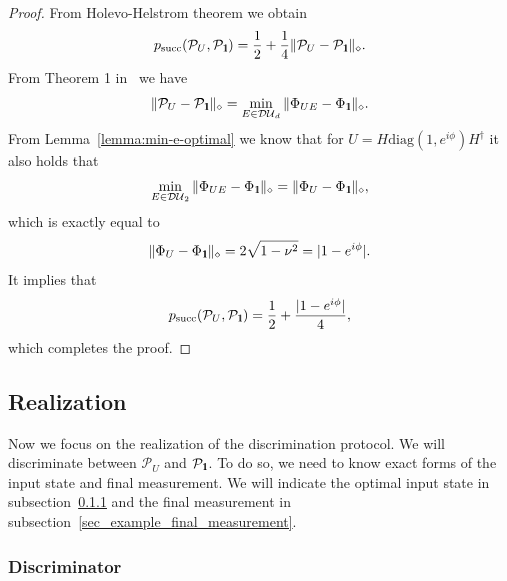 \documentclass[preprint,12pt, a4paper]{elsarticle}
\newcommand{\1}{{\rm 1\hspace{-0.9mm}l}}
\newcommand{\Id}{{\rm 1\hspace{-0.9mm}l}}
\newcommand{\PP}{\mathcal{P}}
\newcommand{\diaguni}{\ensuremath{\mathcal{DU}}}
\newcommand{\diag}{\mathrm{diag}}
\begin{document}
\begin{proof}
	From Holevo-Helstrom theorem we obtain
	\begin{equation}
p_{\text{succ}}(\PP_{U}, \PP_{\Id}) = \frac{1}{2} + \frac{1}{4} \| \PP_{U} - \PP_{\Id} \|_\diamond.
	\end{equation}
	From Theorem 1 in~\cite{puchala2018strategies} we have 
	\begin{equation}
	\|\PP_U - \PP_\Id\|_\diamond = \min_{E \in \diaguni_d} \|\Phi_{UE} - 
	\Phi_\Id\|_\diamond. 
	\end{equation}
	From Lemma~\ref{lemma:min-e-optimal} we know that for 
	$U =  H \diag(1, e^{i \phi}) H^\dagger$ it also holds that
	\begin{equation}
		\min_{E \in \diaguni_2} \|\Phi_{UE} - 
	\Phi_\Id\|_\diamond = \|\Phi_{U} - 
	\Phi_\Id\|_\diamond,
	\end{equation} which is exactly equal to 
	\begin{equation}
	\|\Phi_{U} - 
	\Phi_\Id\|_\diamond = 2\sqrt{1 - \nu^2} = |1-e^{i   \phi }|. 
	\end{equation}
	It implies that
	\begin{equation}
	p_{\text{succ}}(\PP_{U}, \PP_{\Id}) = \frac{1}{2} + \frac{|1-e^{i \phi}|}{4},
	\end{equation} which completes the proof.
\end{proof}





\subsection{Realization}\label{sec:example_realization}
Now we focus on the realization of the discrimination protocol. We will 
discriminate between $\PP_U$ and $\PP_\1$. To do so, we need to know exact 
forms of the input state and final measurement. We will indicate the optimal 
input state in subsection~\ref{sec:example_discriminator} and the final 
measurement in subsection~\ref{sec_example_final_measurement}.


\subsubsection{Discriminator}\label{sec:example_discriminator}
\end{document}
